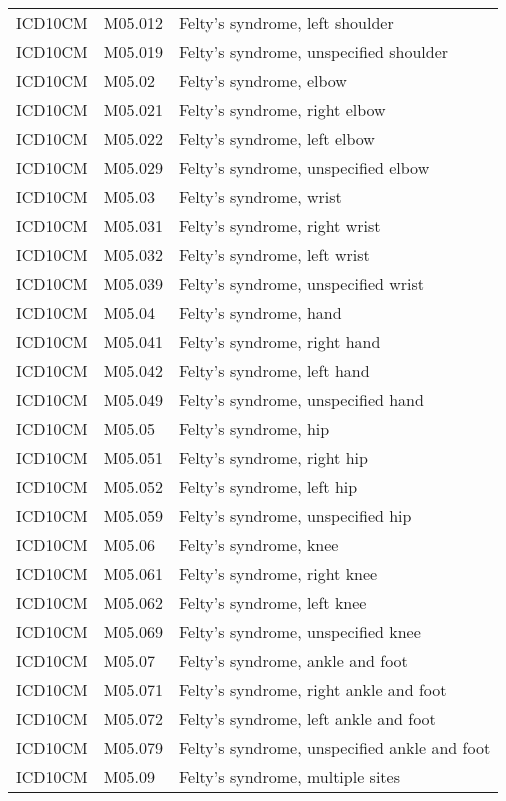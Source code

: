 \begin{longtable}{p{}p{}p{}}
  ICD10CM & M05.012 & Felty's syndrome, left shoulder \\ 
  ICD10CM & M05.019 & Felty's syndrome, unspecified shoulder \\ 
  ICD10CM & M05.02 & Felty's syndrome, elbow \\ 
  ICD10CM & M05.021 & Felty's syndrome, right elbow \\ 
  ICD10CM & M05.022 & Felty's syndrome, left elbow \\ 
  ICD10CM & M05.029 & Felty's syndrome, unspecified elbow \\ 
  ICD10CM & M05.03 & Felty's syndrome, wrist \\ 
  ICD10CM & M05.031 & Felty's syndrome, right wrist \\ 
  ICD10CM & M05.032 & Felty's syndrome, left wrist \\ 
  ICD10CM & M05.039 & Felty's syndrome, unspecified wrist \\ 
  ICD10CM & M05.04 & Felty's syndrome, hand \\ 
  ICD10CM & M05.041 & Felty's syndrome, right hand \\ 
  ICD10CM & M05.042 & Felty's syndrome, left hand \\ 
  ICD10CM & M05.049 & Felty's syndrome, unspecified hand \\ 
  ICD10CM & M05.05 & Felty's syndrome, hip \\ 
  ICD10CM & M05.051 & Felty's syndrome, right hip \\ 
  ICD10CM & M05.052 & Felty's syndrome, left hip \\ 
  ICD10CM & M05.059 & Felty's syndrome, unspecified hip \\ 
  ICD10CM & M05.06 & Felty's syndrome, knee \\ 
  ICD10CM & M05.061 & Felty's syndrome, right knee \\ 
  ICD10CM & M05.062 & Felty's syndrome, left knee \\ 
  ICD10CM & M05.069 & Felty's syndrome, unspecified knee \\ 
  ICD10CM & M05.07 & Felty's syndrome, ankle and foot \\ 
  ICD10CM & M05.071 & Felty's syndrome, right ankle and foot \\ 
  ICD10CM & M05.072 & Felty's syndrome, left ankle and foot \\ 
  ICD10CM & M05.079 & Felty's syndrome, unspecified ankle and foot \\ 
  ICD10CM & M05.09 & Felty's syndrome, multiple sites \\ 

\end{longtable}
